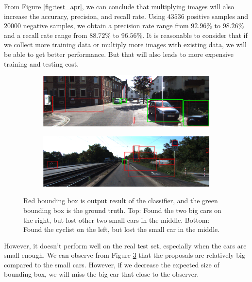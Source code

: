 \documentclass{article} %
\begin{document}
From Figure \ref{fig:test_apr}, we can conclude that multiplying images will also increase the accuracy, precision, and recall rate. Using $43536$ positive samples and $20000$ negative samples, we obtain a precision rate range from $92.96\%$ to $98.26\%$ and a recall rate range from $88.72\%$ to $96.56\%$. It is reasonable to consider that if we collect more training data or multiply more images with existing data, we will be able to get better performance. But that will also leads to more expensive training and testing cost. 

\begin{figure}[htb]
\begin{subfigure}
    \centering
    \includegraphics[width=.9\linewidth]{toosmall1.eps}
    \label{fig:toosmall1}
\end{subfigure}
\begin{subfigure}
    \centering
    \includegraphics[width=.9\linewidth]{toosmall2.eps}
    \label{fig:toosmall2}
\end{subfigure}
\caption{Red bounding box is output result of the classifier, and the green bounding box is the ground truth. Top: Found the two big cars on the right, but lost other two small cars in the middle. Bottom: Found the cyclist on the left, but lost the small car in the middle.
\label{fig:toosmall}}
\end{figure}

However, it doesn't perform well on the real test set, especially when the cars are small enough. We can observe from Figure \ref{fig:toosmall} that the proposals are relatively big compared to the small cars. However, if we decrease the expected size of bounding box, we will miss the big car that close to the observer. 
\end{document}
